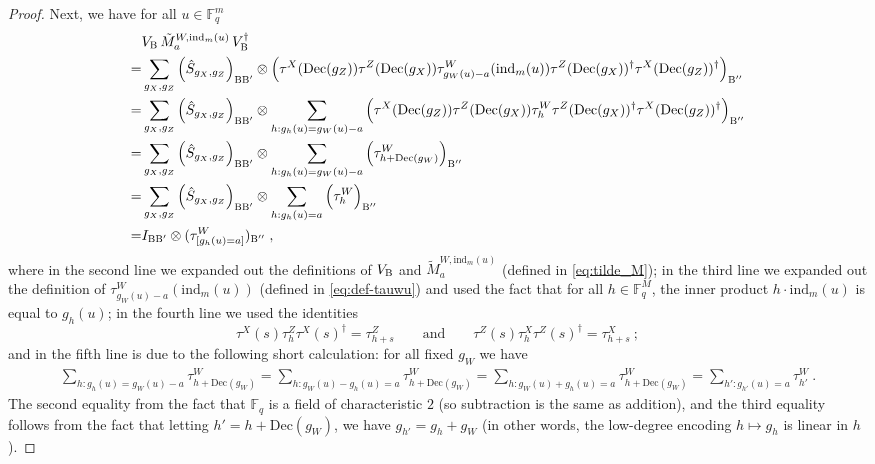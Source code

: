 \documentclass[11pt]{article}
\theoremstyle{definition}
\newcommand{\Id}{\ensuremath{I}}
\newcommand{\F}{\ensuremath{\mathbb{F}}}
\newcommand{\ind}{\ensuremath{\mathrm{ind}}}
\newcommand{\labelstyle}[1]{\ensuremath{\textsc{#1}}\xspace}
\newcommand{\bob}{\labelstyle{B}}
\newcommand{\coded}{\mathrm{Dec}}
\begin{document}
\begin{proof}
	Next, we have for all $u \in \F_q^m$ 
	\begin{align}
		&V_\bob \, \tilde{M}^{W,\ind_m(u)}_a \, V_\bob^\dagger \notag \\
		= &\sum_{g_X, g_Z} \Big( \hat{S}_{g_X,g_Z}  \Big)_{\bob \bob'} \otimes \Big ( \tau^X(\coded(g_Z)) \tau^Z(\coded(g_X)) \tau^W_{g_W(u) - a}(\ind_m(u))    \tau^Z(\coded(g_X))^\dagger \tau^X(\coded(g_Z))^\dagger \Big)_{\bob ''} \notag \\
		= &\sum_{g_X, g_Z} \Big( \hat{S}_{g_X,g_Z}  \Big)_{\bob \bob'} \otimes \sum_{h : g_h(u) = g_W(u) - a} \Big ( \tau^X(\coded(g_Z)) \tau^Z(\coded(g_X)) \tau^W_h   \tau^Z(\coded(g_X))^\dagger \tau^X(\coded(g_Z))^\dagger \Big)_{\bob ''} \notag \\
		= &\sum_{g_X, g_Z} \Big( \hat{S}_{g_X,g_Z}  \Big)_{\bob \bob'} \otimes \sum_{h : g_h(u) = g_W(u) - a} \Big ( \tau^W_{h + \coded(g_W)}   \Big)_{\bob ''} \notag \\
	= &\sum_{g_X, g_Z} \Big( \hat{S}_{g_X,g_Z}  \Big)_{\bob \bob'} \otimes \sum_{h : g_h(u) = a} \Big ( \tau^W_{h}   \Big)_{\bob ''} \notag \\
= &\Id_{\bob \bob'} \otimes (\tau^W_{[g_h(u)=a]})_{\bob''}\;,		\label{eq:qld-unitary-6}
	\end{align}
	where in the second line we expanded out the definitions of $V_\bob$ and $\tilde{M}^{W,\ind_m(u)}_a$ (defined in \cref{eq:tilde_M}); in the third line we expanded out the definition of $\tau^W_{g_W(u) - a}(\ind_m(u))$ (defined in \cref{eq:def-tauwu}) and used the fact that for all $h \in \F_q^M$, the inner product $h \cdot \ind_m(u)$ is equal to $g_h(u)$; in the fourth line we used the identities
	\[
		\tau^X(s) \tau^Z_h \tau^X(s)^\dagger = \tau^Z_{h + s} \qquad \text{and} \qquad \tau^Z(s) \tau^X_h \tau^Z(s)^\dagger = \tau^X_{h + s}~;
	\]
	and in the fifth line is due to the following short calculation: for all fixed $g_W$ we have
	\begin{align*}
		\sum_{h : g_h(u) = g_W(u) - a}  \tau^W_{h + \coded(g_W)} = \sum_{h: g_W(u) - g_h(u) = a} \tau^W_{h + \coded(g_W)} = \sum_{h: g_W(u) + g_h(u) = a} \tau^W_{h + \coded(g_W)} = \sum_{h': g_{h'}(u) = a} \tau^W_{h'}~.
	\end{align*}
	The second equality from the fact that $\F_q$ is a field of characteristic $2$ (so subtraction is the same as addition), and the third equality follows from the fact that letting $h' = h + \coded(g_W)$, we have $g_{h'} = g_h + g_W$ (in other words, the low-degree encoding $h \mapsto g_h$ is linear in $h$). 
	

\end{proof}
\end{document}
